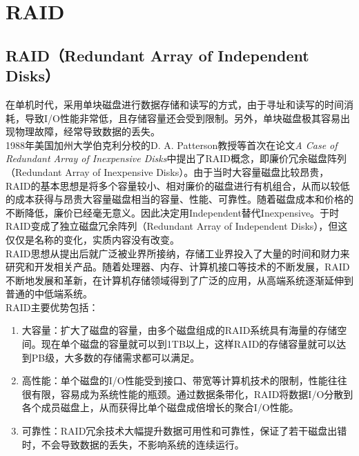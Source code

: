 \newpage

\section{RAID}

\subsection{RAID（Redundant Array of Independent Disks）}

在单机时代，采用单块磁盘进行数据存储和读写的方式，由于寻址和读写的时间消耗，导致I/O性能非常低，且存储容量还会受到限制。另外，单块磁盘极其容易出现物理故障，经常导致数据的丢失。 \\

1988年美国加州大学伯克利分校的D. A. Patterson教授等首次在论文\textit{A Case of Redundant Array of Inexpensive Disks}中提出了RAID概念，即廉价冗余磁盘阵列（Redundant Array of Inexpensive Disks）。由于当时大容量磁盘比较昂贵，RAID的基本思想是将多个容量较小、相对廉价的磁盘进行有机组合，从而以较低的成本获得与昂贵大容量磁盘相当的容量、性能、可靠性。随着磁盘成本和价格的不断降低，廉价已经毫无意义。因此决定用Independent替代Inexpensive。于时RAID变成了独立磁盘冗余阵列（Redundant Array of Independent Disks），但这仅仅是名称的变化，实质内容没有改变。 \\

RAID思想从提出后就广泛被业界所接纳，存储工业界投入了大量的时间和财力来研究和开发相关产品。随着处理器、内存、计算机接口等技术的不断发展，RAID不断地发展和革新，在计算机存储领域得到了广泛的应用，从高端系统逐渐延伸到普通的中低端系统。 \\

RAID主要优势包括：

\begin{enumerate}
	\item 大容量：扩大了磁盘的容量，由多个磁盘组成的RAID系统具有海量的存储空间。现在单个磁盘的容量就可以到1TB以上，这样RAID的存储容量就可以达到PB级，大多数的存储需求都可以满足。

	\item 高性能：单个磁盘的I/O性能受到接口、带宽等计算机技术的限制，性能往往很有限，容易成为系统性能的瓶颈。通过数据条带化，RAID将数据I/O分散到各个成员磁盘上，从而获得比单个磁盘成倍增长的聚合I/O性能。

	\item 可靠性：RAID冗余技术大幅提升数据可用性和可靠性，保证了若干磁盘出错时，不会导致数据的丢失，不影响系统的连续运行。
\end{enumerate}

